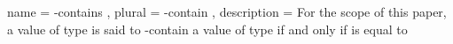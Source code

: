 \documentclass{report}
\begin{document}
  { name = -contains
  , plural = -contain
  , description = {For the scope of this paper, a value  of type    is said to -contain a value  of type  if and only if  is equal to  }
  }

\clearpage{}

\printglossary{}
\end{document}
